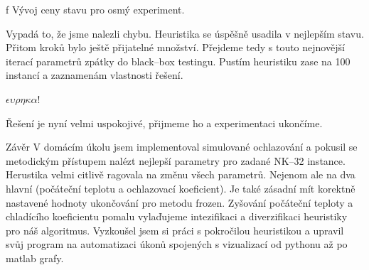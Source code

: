 \centerline{ \picwidth=17cm  }
\caption/f Vývoj ceny stavu pro osmý experiment.
\bigskip

Vypadá to, že jsme nalezli chybu. Heuristika se úspěšně usadila v nejlepším stavu. Přitom kroků bylo ještě přijatelné množství. Přejdeme tedy s touto nejnovější iterací parametrů zpátky do black--box testingu. Pustím heuristiku zase na 100 instancí a zaznamenám vlastnosti řešení.

\bigskip
\centerline{}\bigskip

\hfill $\epsilon\upsilon\rho\eta\kappa\alpha$!

Řešení je nyní velmi uspokojivé, přijmeme ho a experimentaci ukončíme.

\sec Závěr
V domácím úkolu jsem implementoval simulované ochlazování a pokusil se metodickým přístupem nalézt nejlepší parametry pro zadané NK--32 instance. Herustika velmi citlivě ragovala na změnu všech parametrů. Nejenom ale na dva hlavní (počáteční teplotu a ochlazovací koeficient). Je také zásadní mít korektně nastavené hodnoty ukončování pro metodu frozen. Zyšování počáteční teploty a chladícího koeficientu pomalu vylaďujeme intezifikaci a diverzifikaci heuristiky pro náš algoritmus. Vyzkoušel jsem si práci s pokročilou heuristikou a upravil svůj program na automatizaci úkonů spojených s vizualizací od pythonu až po matlab grafy. 




\bye
